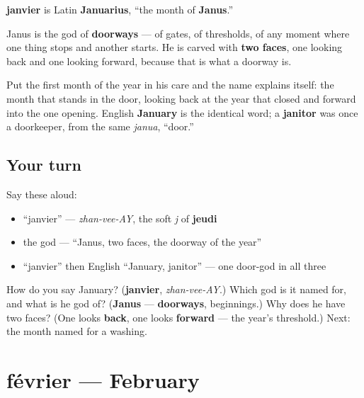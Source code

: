 \begin{cousinweb}
\textbf{janvier} is Latin \textbf{Januarius}, \textquotedblleft{}the month of \textbf{Janus}.\textquotedblright{}

Janus is the god of \textbf{doorways} — of gates, of thresholds, of any moment where one thing stops and another starts. He is carved with \textbf{two faces}, one looking back and one looking forward, because that is what a doorway is.

Put the first month of the year in his care and the name explains itself: the month that stands in the door, looking back at the year that closed and forward into the one opening. English \textbf{January} is the identical word; a \textbf{janitor} was once a doorkeeper, from the same \emph{janua}, \textquotedblleft{}door.\textquotedblright{}
\end{cousinweb}

\subsection*{Your turn}
Say these aloud:

\begin{itemize}
\raggedright
  \item \textquotedblleft{}janvier\textquotedblright{} — \emph{zhan-vee-AY}, the soft \emph{j} of \textbf{jeudi}
  \item the god — \textquotedblleft{}Janus, two faces, the doorway of the year\textquotedblright{}
  \item \textquotedblleft{}janvier\textquotedblright{} then English \textquotedblleft{}January, janitor\textquotedblright{} — one door-god in all three
\end{itemize}

\begin{tcolorbox}[breakable,colback=teal!4,colframe=teal!35!black,title={Before you move on}]
How do you say January? (\textbf{janvier}, \emph{zhan-vee-AY}.) Which god is it named for, and what is he god of? (\textbf{Janus} — \textbf{doorways}, beginnings.) Why does he have two faces? (One looks \textbf{back}, one looks \textbf{forward} — the year's threshold.) Next: the month named for a washing.
\end{tcolorbox}
\section[février]{février — February}

\label{lesson:FR-C09-fevrier}




